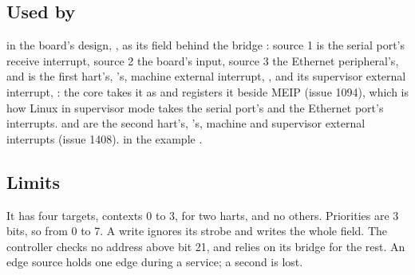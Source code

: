 \subsection*{Used by}

 in the board's design, , as its field
 behind the bridge : source 1 is the serial
port's receive interrupt, source 2 the board's  input,
source 3 the Ethernet peripheral's, and
 is the first hart's, 's, machine external
interrupt, ,
and  its supervisor external interrupt, :
the core takes it as  and registers it beside MEIP
(issue 1094), which is how Linux in supervisor mode takes the serial
port's and the Ethernet port's interrupts.  and
 are the second hart's, 's, machine and
supervisor external interrupts (issue 1408).
 in the example .

\subsection*{Limits}

It has four targets, contexts 0 to 3, for two harts, and no others.
Priorities are 3
bits, so from 0 to 7. A write ignores its strobe and writes the whole
field. The controller checks no address above bit 21, and relies on its
bridge for the rest. An edge source holds one edge during a service; a
second is lost.
